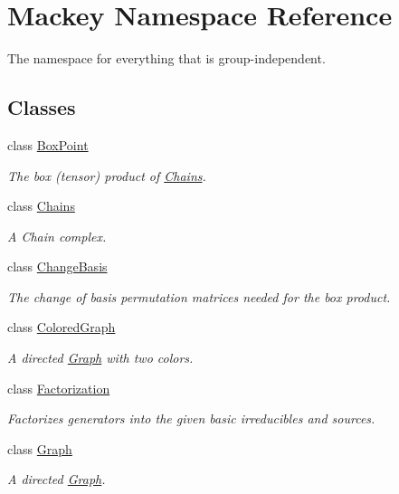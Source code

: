 \hypertarget{namespaceMackey}{}\section{Mackey Namespace Reference}
\label{namespaceMackey}


The namespace for everything that is group-\/independent.  


\subsection*{Classes}
\begin{DoxyCompactItemize}
\item 
class \hyperlink{classMackey_1_1BoxPoint}{Box\+Point}
\begin{DoxyCompactList}\small\item\em The box (tensor) product of \hyperlink{classMackey_1_1Chains}{Chains}. \end{DoxyCompactList}\item 
class \hyperlink{classMackey_1_1Chains}{Chains}
\begin{DoxyCompactList}\small\item\em A Chain complex. \end{DoxyCompactList}\item 
class \hyperlink{classMackey_1_1ChangeBasis}{Change\+Basis}
\begin{DoxyCompactList}\small\item\em The change of basis permutation matrices needed for the box product. \end{DoxyCompactList}\item 
class \hyperlink{classMackey_1_1ColoredGraph}{Colored\+Graph}
\begin{DoxyCompactList}\small\item\em A directed \hyperlink{classMackey_1_1Graph}{Graph} with two colors. \end{DoxyCompactList}\item 
class \hyperlink{classMackey_1_1Factorization}{Factorization}
\begin{DoxyCompactList}\small\item\em Factorizes generators into the given basic irreducibles and sources. \end{DoxyCompactList}\item 
class \hyperlink{classMackey_1_1Graph}{Graph}
\begin{DoxyCompactList}\small\item\em A directed \hyperlink{classMackey_1_1Graph}{Graph}. \end{DoxyCompactList}\item 

\end{DoxyCompactItemize}
